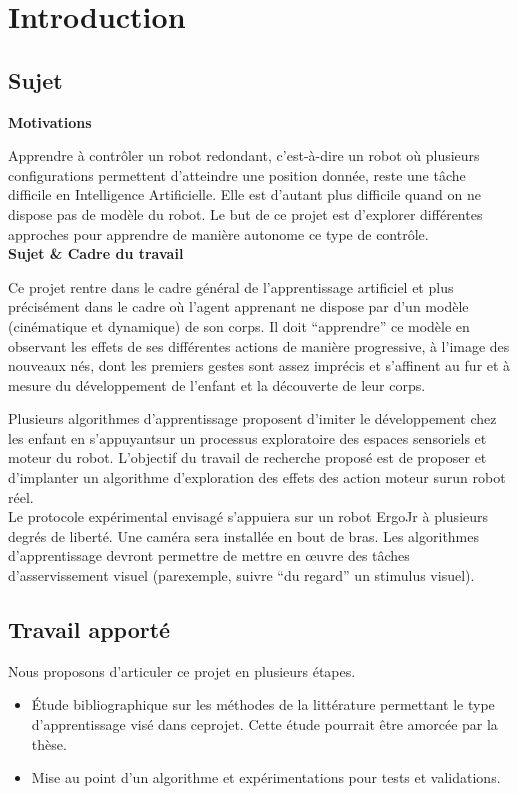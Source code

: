 \documentclass[11pt,french]{article}
\begin{document}
\section{Introduction}
\subsection{Sujet}

\noindent\textbf{Motivations}

Apprendre à contrôler un robot redondant, c’est-à-dire un robot où plusieurs configurations permettent d’atteindre une position donnée, reste une tâche difficile en Intelligence Artificielle. Elle est d’autant plus difficile quand on ne dispose pas de modèle du robot. Le but de ce projet est d’explorer différentes approches pour apprendre de manière autonome ce type de contrôle.\\[10pt]
\noindent\textbf{Sujet \& Cadre du travail}

Ce projet rentre dans le cadre général de l’apprentissage artificiel et plus précisément dans le cadre où l’agent apprenant ne dispose par d’un modèle (cinématique et dynamique) de son corps. Il doit “apprendre” ce modèle en observant les effets de ses différentes actions de manière progressive, à l’image des nouveaux nés, dont les premiers gestes sont assez imprécis et s’affinent au fur et à mesure du développement de l’enfant et la découverte de leur corps.

Plusieurs algorithmes d’apprentissage proposent d’imiter le développement chez les enfant en s’appuyantsur un processus exploratoire des espaces sensoriels et moteur du robot. L’objectif du travail de recherche proposé est de proposer et d’implanter un algorithme d’exploration des effets des action moteur surun robot réel.\\[10pt]
Le protocole expérimental envisagé s’appuiera sur un robot ErgoJr à plusieurs degrés de liberté. Une caméra sera installée en bout de bras. Les algorithmes d’apprentissage devront permettre de mettre en œuvre des tâches d’asservissement visuel (parexemple, suivre “du regard” un stimulus visuel).


\subsection{Travail apporté}

Nous proposons d’articuler ce projet en plusieurs étapes.
\begin{itemize}
    \item Étude bibliographique sur les méthodes de la littérature permettant le type d’apprentissage visé dans ceprojet. Cette étude pourrait être amorcée par la thèse.
    \item Mise au point d’un algorithme et expérimentations pour tests et validations.
\end{itemize}
\end{document}
